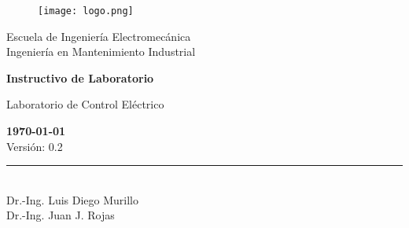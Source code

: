 \documentclass[12pt,letterpaper]{report}
\newcommand{\escuela}{Escuela de Ingeniería Electromecánica}
\newcommand{\programa}{Ingeniería en Mantenimiento Industrial}
\newcommand{\curso}{Laboratorio de Control Eléctrico}
\begin{document}
\begin{titlepage}

\begin{center}
\vspace*{1in}
\begin{figure}[htb]
\begin{center}
\texttt{[image: logo.png]}
\end{center}
\end{figure}
\vspace*{0.4in}
\begin{Large}
\escuela\\
\vspace*{0.15in}
\programa\\
\vspace*{0.8in}
\end{Large}
\vspace*{0.2in}
\begin{Large}
\textbf{Instructivo de Laboratorio} \\
\end{Large}
\vspace*{0.3in}
\begin{large}
\curso\\
\end{large}
\vspace*{2.5in}
\begin{tiny}
\textbf{\today}\\
Versión: 0.2\\
\end{tiny}
\rule{60mm}{0.1mm}\\
\vspace*{0.1 in}
Dr.-Ing. Luis Diego Murillo \\
Dr.-Ing. Juan J. Rojas
\end{center}

\end{titlepage}

\tableofcontents



% 







\appendix







\end{document}
